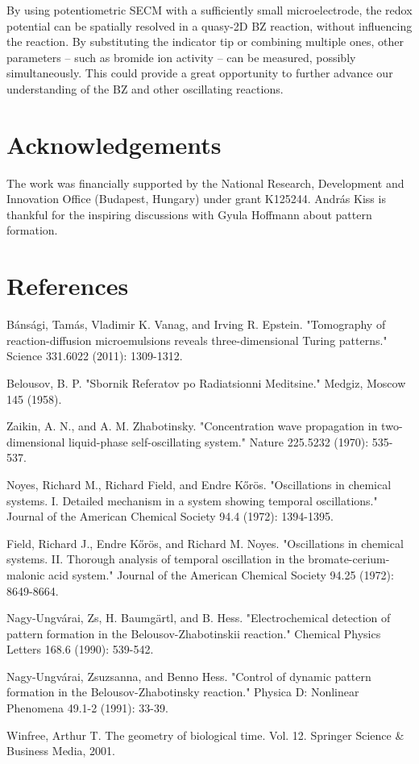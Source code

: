 \documentclass[3p, twocolumn]{elsarticle}
\begin{document}
By using potentiometric SECM with a sufficiently small microelectrode, the redox potential can be spatially resolved in a quasy-2D BZ reaction, without influencing the reaction.
By substituting the indicator tip or combining multiple ones, other parameters -- such as bromide ion activity -- can be measured, possibly simultaneously.
This could provide a great opportunity to further advance our understanding of the BZ and other oscillating reactions.

\section*{Acknowledgements}
The work was financially supported by the National Research, Development and Innovation Office (Budapest, Hungary) under grant K125244.
András Kiss is thankful for the inspiring discussions with Gyula Hoffmann about pattern formation.
\section*{References}

\begin{thebibliography}{5}
Bánsági, Tamás, Vladimir K. Vanag, and Irving R. Epstein. "Tomography of reaction-diffusion microemulsions reveals three-dimensional Turing patterns." Science 331.6022 (2011): 1309-1312.

Belousov, B. P. "Sbornik Referatov po Radiatsionni Meditsine." Medgiz, Moscow 145 (1958).

Zaikin, A. N., and A. M. Zhabotinsky. "Concentration wave propagation in two-dimensional liquid-phase self-oscillating system." Nature 225.5232 (1970): 535-537.

Noyes, Richard M., Richard Field, and Endre Kőrös. "Oscillations in chemical systems. I. Detailed mechanism in a system showing temporal oscillations." Journal of the American Chemical Society 94.4 (1972): 1394-1395.

Field, Richard J., Endre Kőrös, and Richard M. Noyes. "Oscillations in chemical systems. II. Thorough analysis of temporal oscillation in the bromate-cerium-malonic acid system." Journal of the American Chemical Society 94.25 (1972): 8649-8664.


Nagy-Ungvárai, Zs, H. Baumgärtl, and B. Hess. "Electrochemical detection of pattern formation in the Belousov-Zhabotinskii reaction." Chemical Physics Letters 168.6 (1990): 539-542. 

Nagy-Ungvárai, Zsuzsanna, and Benno Hess. "Control of dynamic pattern formation in the Belousov-Zhabotinsky reaction." Physica D: Nonlinear Phenomena 49.1-2 (1991): 33-39.

 Winfree, Arthur T. The geometry of biological time. Vol. 12. Springer Science \& Business Media, 2001.

\end{thebibliography}
\end{document}

